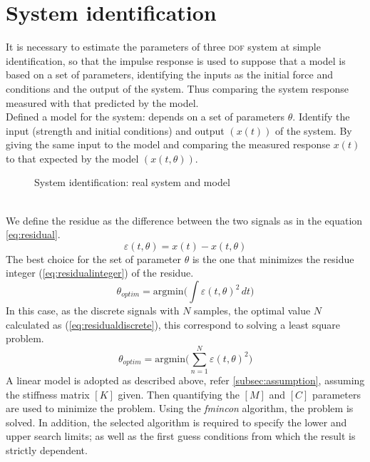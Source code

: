 \section{System identification}
\label{sec:sysidentification}
It is necessary to estimate the parameters of three \textsc{dof} system at simple 
identification, so that the impulse response is used to suppose that a model is 
based on a set of parameters, identifying the inputs as the initial force and 
conditions and the output of the system.
Thus comparing the system response measured with that predicted by the model.\\
Defined a model for the system: depends on a set of parameters $\theta$. 
Identify the input (strength and initial conditions) and output $(x(t))$ of the system. 
By giving the same input to the model and comparing the measured response $x(t)$ 
to that expected by the model $(x(t,\theta))$.
%
\begin{figure}[htb]
	\centering
	\resizebox{.50\linewidth}{!}{}
	\label{fig:systemmodel}
	\caption{System identification: real system and model}
\end{figure}
%
\\We define the residue as the difference between the two signals as in the 
equation \eqref{eq:residual}.
\begin{equation}
\label{eq:residual}
	\varepsilon(t,\theta) = x(t) - x(t,\theta)
\end{equation} 
The best choice for the set of parameter $\theta$ is the one that minimizes the 
residue integer (\ref{eq:residualinteger}) of the residue. 
\begin{equation}
\label{eq:residualinteger}
	\theta_{optim} = \text{argmin} \biggl( \int \varepsilon(t,\theta)^2 \, dt \biggr)
\end{equation} 
In this case, as the discrete signals with $N$ samples, the optimal value $N$ 
calculated as (\ref{eq:residualdiscrete}), this correspond to solving a least 
square problem.
\begin{equation}
\label{eq:residualdiscrete} 
\theta_{optim} = \text{argmin} \Biggl( \sum_{n=1}^{N} \varepsilon(t,\theta)^2 \Biggr)
\end{equation}
%
A linear model is adopted as described above, refer \ref{subsec:assumption}, 
assuming the stiffness matrix $[K]$ given.
Then quantifying the $[M]$ and $[C]$ parameters are used to minimize the problem.
Using the \emph{fmincon} algorithm, the problem is solved. In addition, the 
selected algorithm is required to specify the lower and upper search limits; 
as well as the first guess conditions from which the result is strictly dependent.
%
